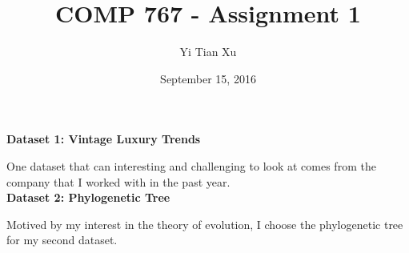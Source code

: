 \documentclass[12pt]{article}
\begin{document}
\title{COMP 767 - Assignment 1}
\author{Yi Tian Xu}
\date{September 15, 2016}
\maketitle

{\bf Dataset 1: Vintage Luxury Trends\\}

One dataset that can interesting and challenging to look at comes from the company that I worked with in the past year.\\ 


{\bf Dataset 2: Phylogenetic Tree \\}

Motived by my interest in the theory of evolution, I choose the phylogenetic tree for my second dataset. 
\end{document}
